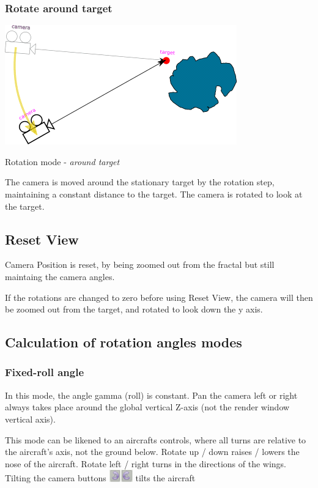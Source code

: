 \subsubsection{Rotate around target}\label{rotate-around-target}
\nopagebreak

\includegraphics[width=0.5\linewidth]{img/manual/media/rotate_around_target}
\nopagebreak

Rotation mode - \emph{around target}
\nopagebreak

The camera is moved around the stationary target by the rotation step,
maintaining a constant distance to the target. The camera is rotated to look at
the target.

\subsection{Reset View}\label{reset-view}

Camera Position is reset, by being zoomed out from the fractal but still
maintaing the camera angles.

If the rotations are changed to zero before using Reset View, the camera will
then be zoomed out from the target, and rotated to look down the y axis.

\subsection{Calculation of rotation angles
	modes}\label{calculation-of-rotation-angles-modes}

\subsubsection{Fixed-roll angle}\label{fixed-roll-angle}

In this mode, the angle gamma (roll) is constant. Pan the camera left or right
always takes place around the global vertical Z-axis (not the render window
vertical axis).

This mode can be likened to an aircrafts controls, where all turns are relative
to the aircraft's axis, not the ground below. Rotate up / down raises / lowers
the nose of the aircraft. Rotate left / right turns in the directions of the
wings. Tilting the camera buttons
\includegraphics[width=0.20000in,height=0.20000in]{img/manual/media/button_roll_left.png}\includegraphics[width=0.20000in,height=0.20000in]{img/manual/media/button_roll_right.png}
tilts the aircraft

